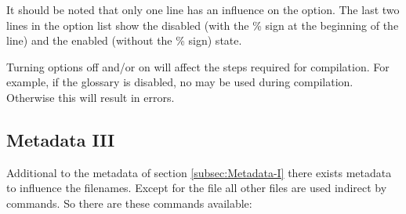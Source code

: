 It should be noted that only one line has an influence on the option. The last
two lines in the option list show the disabled (with the \% sign at the
beginning of the line) and the enabled (without the \% sign) state.
\bigbreak

 Turning options off and/or on will affect the steps
required for compilation. For example, if the glossary is disabled, no
 may be used during compilation. Otherwise this will
result in errors.

\subsection{Metadata III}\label{subsec:Metadata-III}

Additional to the metadata of section \ref{subsec:Metadata-I} there exists
metadata to influence the filenames. Except for the
 file all other files are used indirect
by commands. So there are these commands available:

